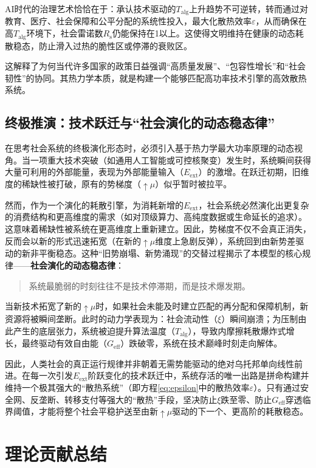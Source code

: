 \documentclass[twocolumn]{ctexart}
\newcommand{\upmu}{\uparrow\!\mu}
\newcommand{\upxi}{\xi}
\newcommand{\Talg}{T_{\mathrm{alg}}}
\newcommand{\Geff}{G_{\mathrm{eff}}}
\newcommand{\Eext}{E_{\mathrm{ext}}}
\newcommand{\Rs}{R_{\mathrm{s}}}
\newcommand{\veps}{\varepsilon}
\begin{document}
AI时代的治理艺术恰恰在于：承认技术驱动的$\Talg$上升趋势不可逆转，转而通过对教育、医疗、社会保障和公平分配的系统性投入，最大化散热效率$\veps$，从而确保在高$\Talg$环境下，社会雷诺数$\Rs$仍能保持在1以上。这使得文明维持在健康的动态耗散稳态，防止滑入过热的脆性区或停滞的衰败区。

这解释了为何当代许多国家的政策日益强调“高质量发展”、“包容性增长”和“社会韧性”的协同。其热力学本质，就是构建一个能够匹配高功率技术引擎的高效散热系统。

\subsection{终极推演：技术跃迁与“社会演化的动态稳态律”}

在思考社会系统的终极演化形态时，必须引入基于热力学最大功率原理的动态视角。当一项重大技术突破（如通用人工智能或可控核聚变）发生时，系统瞬间获得大量可利用的外部能量，表现为外部能量输入（$\Eext$）的激增。在跃迁初期，旧维度的稀缺性被打破，原有的势梯度（$\upmu$）似乎暂时被拉平。

然而，作为一个演化的耗散引擎，为消耗新增的$\Eext$，社会系统必然演化出更复杂的消费结构和更高维度的需求（如对顶级算力、高纯度数据或生命延长的追求）。这意味着稀缺性被系统在更高维度上重新建立。因此，势梯度不仅不会真正消失，反而会以新的形式迅速拓宽（在新的$\upmu$维度上急剧反弹），系统回到由新势差驱动的新非平衡稳态。这种“旧势崩塌、新势涌现”的交替过程揭示了本模型的核心规律——\textbf{社会演化的动态稳态律}：

\begin{quote}
系统最脆弱的时刻往往不是技术停滞期，而是技术爆发期。
\end{quote}

当新技术拓宽了新的$\upmu$时，如果社会未能及时建立匹配的再分配和保障机制，新资源将被瞬间垄断。此时的动力学表现为：社会流动性（$\upxi$）瞬间崩溃；为压制由此产生的底层张力，系统被迫提升算法温度（$\Talg$），导致内摩擦耗散爆炸式增长，最终驱动有效自由能（$\Geff$）跌破零，系统在技术巅峰时刻走向解体。

因此，人类社会的真正运行规律并非朝着无需势能驱动的绝对乌托邦单向线性前进。在每一次引发$\Eext$阶跃变化的技术跃迁中，系统存活的唯一出路是拼命构建并维持一个极其强大的“散热系统”（即方程\eqref{eq:epsilon}中的散热效率$\veps$）。只有通过安全网、反垄断、转移支付等强大的“散热”手段，坚决防止$\upxi$跌至零、防止$\Geff$穿透临界阈值，才能将整个社会平稳护送至由新$\upmu$驱动的下一个、更高阶的耗散稳态。

\section{理论贡献总结}
\end{document}
